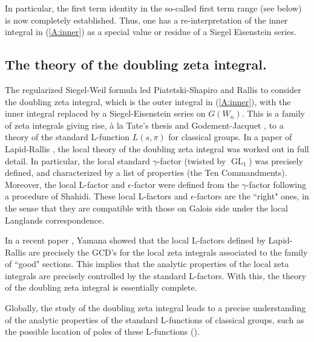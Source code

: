 \documentclass[10pt]{amsart}
\theoremstyle{plain}
\numberwithin{equation}{section}
\begin{document}
In particular, the first term identity in the so-called first term
range (see below) is now completely established. Thus, one has a
re-interpretation of the inner integral in (\ref{A:inner}) as a
special value or residue of a Siegel  Eisenstein series.

\vskip 10pt

\subsection{\bf  The theory of the doubling zeta integral.}  
The regularized Siegel-Weil formula led Piatetski-Shapiro and Rallis \cite{PS-R87}
to consider  the doubling zeta integral, which is the outer integral
in (\ref{A:inner}), with the inner integral replaced by a
Siegel-Eisenstein series on $G(W_n)$.
This  is a family of zeta integrals giving rise, \`a la Tate's thesis
and Godement-Jacquet \cite{GJ}, to a theory of the standard L-function
$L(s,\pi)$ for classical groups. In a paper of Lapid-Rallis \cite{LR}, the
local theory of the doubling zeta integral was worked out in full
detail. In particular, the local standard $\gamma$-factor (twisted by
${\operatorname{GL}}_1$) was precisely defined, and characterized by a list of
properties (the Ten Commandments). Moreover, the local L-factor and
$\epsilon$-factor were defined from the $\gamma$-factor following a
procedure of Shahidi. These local L-factors and $\epsilon$-factors are
the ``right" ones, in the sense that they are compatible with those on
Galois side under the local Langlands correspondence. 
\vskip 5pt

In a recent paper \cite{Y4}, Yamana showed that the local L-factors
defined by Lapid-Rallis \cite{LR} are precisely the GCD's for the local
zeta integrals associated to the family of ``good" sections. This
implies that the analytic properties of the local zeta integrals are
precisely controlled by the standard L-factors. With this, the theory
of the doubling zeta integral is essentially complete.
\vskip 5pt

Globally, the study of the doubling zeta integral leads to a precise
understanding of the analytic properties of the standard L-functions
of classical groups, such as the possible location of poles of these
L-functions (\cite{KR3, T2, Y4}).

\vskip 10pt
\end{document}
